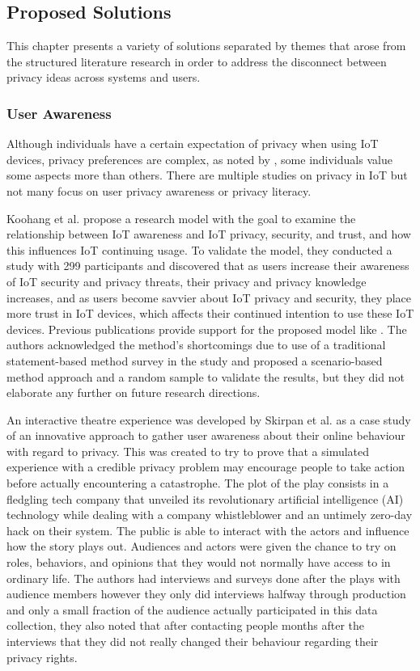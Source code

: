 \subsection{Proposed Solutions}

\par This chapter presents a variety of solutions separated by themes that arose
from the structured literature research in order to address the disconnect
between privacy ideas across systems and users.

\subsubsection{User Awareness}

Although individuals have a certain expectation of privacy when using IoT
devices, privacy preferences are complex, as noted by \cite{naeini2017privacy},
some individuals value some aspects more than others. There are multiple studies
on privacy in IoT but not many focus on user privacy awareness or
privacy literacy.

Koohang et al. \cite{koohang2022internet} propose a research model with
the goal to examine the relationship between IoT awareness and IoT privacy,
security, and trust, and how this influences IoT continuing usage. To validate
the model, they conducted a study with 299 participants and discovered that
as users increase their awareness of IoT security and privacy threats, their
privacy and privacy knowledge increases, and as users become savvier about
IoT privacy and security, they place more trust in IoT devices, which affects
their continued intention to use these IoT devices. Previous publications
provide support for the proposed model like \cite{tsourela2020internet, knijnenburg2022modern}.
The authors acknowledged the method's shortcomings due to use of a traditional
statement-based method survey in the study and proposed a scenario-based
method approach and a random sample to validate the results, but they did
not elaborate any further on future research directions.

An interactive theatre experience was developed by Skirpan et al. \cite{SkirpanPrivacy}
as a case study of an innovative approach to gather user awareness about their
online behaviour with regard to privacy. This was created to try to prove
that a simulated experience with a credible privacy problem may encourage
people to take action before actually encountering a catastrophe. The plot
of the play consists in a fledgling tech company that unveiled its revolutionary
artificial intelligence (AI) technology while dealing with a company whistleblower and an untimely
zero-day hack on their system. The public is able to interact with the actors
and influence how the story plays out. Audiences and actors were given the
chance to try on roles, behaviors, and opinions that they would not normally
have access to in ordinary life. The authors had interviews and surveys
done after the plays with audience members however they only did interviews
halfway through production and only a small fraction of the audience actually
participated in this data collection, they also noted that after contacting
people months after the interviews that they did not really changed their
behaviour regarding their privacy rights.

